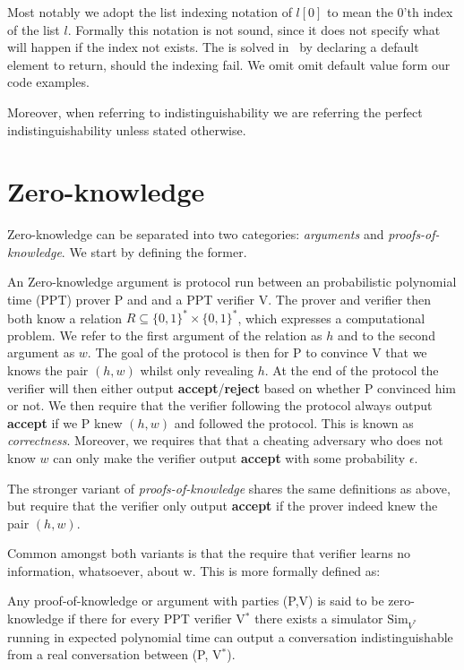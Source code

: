 Most notably we adopt the list indexing notation of $l[0]$ to mean the 0'th
index of the list $l$. Formally this notation is not sound, since it does not
specify what will happen if the index not exists. The is solved in \easycrypt\
by declaring a default element to return, should the indexing fail. We omit omit
default value form our code examples.


Moreover, when referring to indistinguishability we are referring the perfect
indistinguishability unless stated otherwise.

\section{Zero-knowledge}
\label{sec:background:zero-knowledge}
Zero-knowledge can be separated into two categories: \textit{arguments} and
\textit{proofs-of-knowledge}. We start by defining the former.

An Zero-knowledge argument is protocol run between an probabilistic polynomial
time (PPT) prover P and and a PPT verifier V. The prover and verifier then both
know a relation $R \subseteq \{0,1\}^{*} \times \{0,1\}^*$, which expresses a
computational problem. We refer to the first argument of the relation as $h$ and
to the second argument as $w$.
The goal of the protocol is then for P to convince V that we knows the pair
$(h,w)$ whilst only revealing $h$. At the end of the protocol the verifier will
then either output \textbf{accept}/\textbf{reject} based on whether P convinced
him or not.
We then require that the verifier following the protocol always output
\textbf{accept} if we P knew $(h,w)$ and followed the protocol. This is known as \textit{correctness}.
Moreover, we requires that that a cheating adversary who does not know $w$ can
only make the verifier output \textbf{accept} with some probability $\epsilon$.

The stronger variant of \textit{proofs-of-knowledge} shares the same definitions
as above, but require that the verifier only output \textbf{accept} if the
prover indeed knew the pair $(h,w)$.


Common amongst both variants is that the require that verifier learns no
information, whatsoever, about w. This is more formally defined as:

\begin{definition}
  \label{def:zk}
  Any proof-of-knowledge or argument with parties (P,V) is said to be
  zero-knowledge if there for every PPT verifier V$^{*}$ there exists a
  simulator $\text{Sim}_{V^{*}}$ running in expected polynomial time can output a
  conversation indistinguishable from a real conversation between (P, V$^{*}$).
\end{definition}


